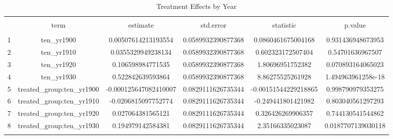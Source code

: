 
\begin{table}[!htbp] \centering 
  \caption{Treatment Effects by Year} 
  \label{table5.2} 
\begin{tabular}{@{\extracolsep{5pt}} cccccc} 
\\[-1.8ex]\hline 
\hline \\[-1.8ex] 
 & term & estimate & std.error & statistic & p.value \\ 
\hline \\[-1.8ex] 
1 & ten\_yr1900 & 0.00507614213193554 & 0.0589932390877368 & 0.0860461675004168 & 0.931436948673953 \\ 
2 & ten\_yr1910 & 0.0355329949238134 & 0.0589932390877368 & 0.602323172507404 & 0.54701636967507 \\ 
3 & ten\_yr1920 & 0.106598984771535 & 0.0589932390877368 & 1.80696951752382 & 0.070893164065023 \\ 
4 & ten\_yr1930 & 0.522842639593864 & 0.0589932390877368 & 8.86275525261928 & 1.494963961258e-18 \\ 
5 & treated\_group:ten\_yr1900 & -0.000125647082410007 & 0.0829111626735344 & -0.00151544229218865 & 0.998790979353275 \\ 
6 & treated\_group:ten\_yr1910 & -0.0206815097752774 & 0.0829111626735344 & -0.249441801421982 & 0.803040561297293 \\ 
7 & treated\_group:ten\_yr1920 & 0.027064381565121 & 0.0829111626735344 & 0.326426269906357 & 0.744130541544862 \\ 
8 & treated\_group:ten\_yr1930 & 0.194979142584381 & 0.0829111626735344 & 2.35166335023087 & 0.0187707139030118 \\ 
\hline \\[-1.8ex] 
\end{tabular} 
\end{table} 
